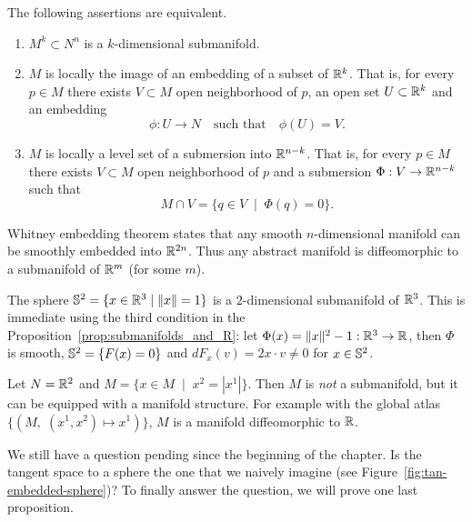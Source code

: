 \begin{proposition}\label{prop:submanifolds_and_R}
  The following assertions are equivalent.
  \begin{enumerate}
    \item $M^k\subset N^n$ is a $k$-dimensional submanifold.
    \item $M$ is locally the image of an embedding of a subset of $\mathbb{R}^k$. That is, for every $p\in M$ there exists $V\subset M$ open neighborhood of $p$, an open set $U\subset\mathbb{R}^k$ and an embedding
    \begin{equation}
      \phi : U \to N \quad\mbox{such that}\quad \phi(U)=V.
    \end{equation}
    \item $M$ is locally a level set of a submersion into $\mathbb{R}^{n-k}$. That is, for every $p\in M$ there exists $V\subset M$ open neighborhood of $p$ and a submersion $\Phi: V \to\mathbb{R}^{n-k}$ such that
    \begin{equation}
      M\cap V = \{q\in V \;\mid\; \Phi(q) = 0\}.
    \end{equation}
  \end{enumerate}
\end{proposition}

\begin{remark}
  Whitney embedding theorem states that any smooth $n$-dimensional manifold can be smoothly embedded into $\mathbb{R}^{2n}$.
  Thus any abstract manifold is diffeomorphic to a submanifold of $\mathbb{R}^m$ (for some $m$).
\end{remark}

\begin{example}\label{ex:s2}
  The sphere $\mathbb{S}^2 = \{x\in\mathbb{R}^3 \mid \|x\| = 1\}$ is a $2$-dimensional submanifold of $\mathbb{R}^3$.
  This is immediate using the third condition in the Proposition~\ref{prop:submanifolds_and_R}: let $\Phi(x) = \|x\|^2 -1 : \mathbb{R}^3 \to \mathbb{R}$, then $\Phi$ is smooth, $\mathbb{S}^2 = \{F(x)=0\}$ and $dF_x(v)= 2x\cdot v \neq 0$ for $x\in\mathbb{S}^2$.
\end{example}

\begin{example}
  Let $N = \mathbb{R}^2$ and $M = \{ x\in M \;\mid\; x^2 = |x^1| \}$.
  Then $M$ is \emph{not} a submanifold, but it can be equipped with a manifold structure.
  For example with the global atlas $\{(M,\; (x^1,x^2)\mapsto x^1)\}$, $M$ is a manifold diffeomorphic to $\mathbb{R}$.
\end{example}

We still have a question pending since the beginning of the chapter.
Is the tangent space to a sphere the one that we naively imagine (see Figure~\ref{fig:tan-embedded-sphere})?
To finally answer the question, we will prove one last proposition.

